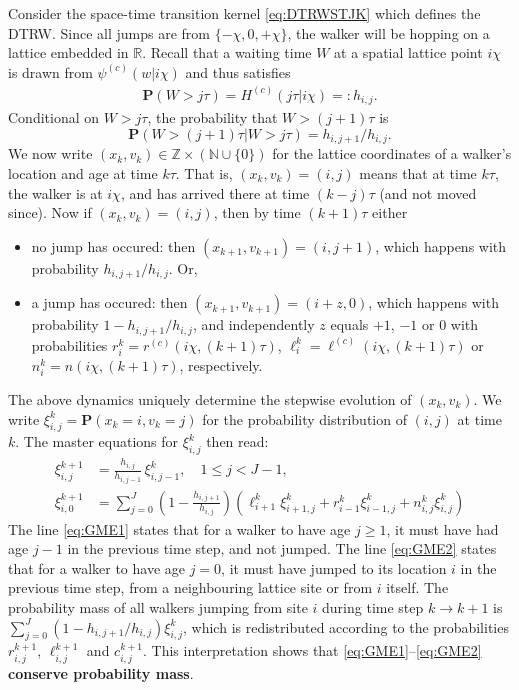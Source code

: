 \documentclass[a4paper,12pt]{elsarticle}
\numberwithin{equation}{section}
\theoremstyle{plain}
\theoremstyle{definition}
\theoremstyle{remark}
\numberwithin{equation}{section}
\newcommand{\spc}{\mathbb R}
\newcommand{\1}{\mathbf 1}
\newcommand{\pr}{\mathbf P}
\begin{document}
Consider the space-time transition kernel \eqref{eq:DTRWSTJK} which defines the DTRW. Since all jumps are from $\{-\chi, 0, +\chi\}$, the walker will be hopping on a lattice embedded in $\spc$.
Recall that a waiting time $W$ at a spatial lattice point $i\chi$ is drawn from $\psi^{(c)}(w | i\chi)$ and thus satisfies
\begin{align}
\pr(W > j\tau) = H^{(c)}(j\tau | i\chi) =: h_{i,j}.
\end{align}
Conditional on $W > j\tau$, the probability that $W > (j + 1) \tau$ is
$$\pr(W > (j + 1)\tau | W > j \tau) = h_{i,j+1} / h_{i,j}.$$
We now write $(x_k,v_k) \in \mathbb Z \times (\mathbb N \cup \{0\})$ for the 
lattice coordinates of a walker's location and age at time 
$k\tau$. That is, $(x_k, v_k) = (i,j)$ 
means that at time $k\tau$, the walker is at $i \chi$, and has arrived there at time $(k-j)\tau$ (and not moved since).
Now if $(x_k, v_k) = (i,j)$, then by time $(k+1)\tau$ either
\begin{itemize}
\item
no jump has occured: then $(x_{k+1}, v_{k+1}) = (i,j+1)$, which happens
with probability $h_{i,j+1} / h_{i,j}$. Or, 
\item
a jump has occured: then $(x_{k+1}, v_{k+1}) = (i + z, 0)$, which happens with
probability $1-h_{i,j+1} / h_{i,j}$, and independently
$z$ equals $+1$, $-1$ or $0$ with probabilities
$r^k_i = r^{(c)}(i\chi, (k+1)\tau)$, $\ell^k_i = \ell^{(c)}(i\chi, (k+1)\tau)$ or
$n^k_i = n(i\chi, (k+1)\tau)$, respectively.
\end{itemize}
The above dynamics uniquely determine the stepwise evolution of $(x_k, v_k)$. 
We write 
$\xi^k_{i,j} = \pr(x_k = i, v_k = j)$
for the probability distribution of $(i,j)$ at time $k$.
The master equations for $\xi^k_{i,j}$ then read:
\begin{align}
\label{eq:GME1}
\xi^{k+1}_{i,j} &= \frac{h_{i,j}}{h_{i,j-1}}\, \xi^k_{i,j-1}, \quad 1 \le j < J-1,
\\
\label{eq:GME2}
\xi^{k+1}_{i,0} &= \sum_{j=0}^J\left(1 - \frac{h_{i,j+1}}{h_{i,j}}\right)
(\ell^k_{i+1} \xi^k_{i+1, j} + r^k_{i-1} \xi^k_{i-1,j}
  + n^k_{i,j} \xi^k_{i,j})
\end{align}
The line \eqref{eq:GME1} states that for a walker to have age $j \ge 1$,
it must have had age $j - 1$ in the previous time step, and not jumped.
The line \eqref{eq:GME2} states that for a walker to have age $j = 0$,
it must have jumped to its location $i$ in the previous time step, from a
neighbouring lattice site or from $i$ itself. The probability mass of all
walkers jumping from site $i$ during time step $k \to k+1$ is
$\sum_{j=0}^J \left(1 - h_{i,j+1} / h_{i,j}\right) \xi^k_{i,j}$,
which is redistributed according to the probabilities $r^{k+1}_{i,j}$,
$\ell^{k+1}_{i,j}$ and $c^{k+1}_{i,j}$. 
This interpretation shows that \eqref{eq:GME1}--\eqref{eq:GME2} 
\textbf{conserve probability mass}. 
\end{document}
